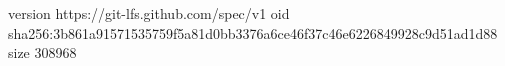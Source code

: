 version https://git-lfs.github.com/spec/v1
oid sha256:3b861a91571535759f5a81d0bb3376a6ce46f37c46e6226849928c9d51ad1d88
size 308968
